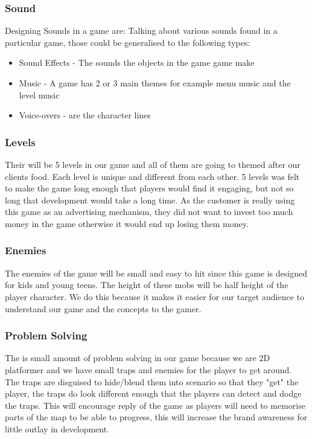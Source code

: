 \documentclass{article}
\begin{document}
\subsubsection{Sound}
Designing Sounds in a game are:
Talking about various sounds found in a particular game, those could be generalised to the following types: 
\begin{itemize}
	\item Sound Effects - The sounds the objects in the game game make
	\item Music -  A game has 2 or 3 main themes for example menu music and the level music
	\item Voice-overs - are the character lines
\end{itemize}

\subsubsection{Levels}
Their will be 5 levels in our game and all of them are going to themed after our clients food. Each level is unique and different from each other. 5 levels was felt to make the game long enough that players would find it engaging, but not so long that development would take a long time. As the customer is really using this game as an advertising mechanism, they did not want to invest too much money in the game otherwise it would end up losing them money.

\subsubsection{Enemies}
The enemies of the game will be small and easy to hit since this game is designed for kids and young teens. The height of these mobs will be half height of the player character. We do this because it makes it easier for our target audience to understand our game and the concepts to the gamer. 


\subsubsection{Problem Solving}
The is small amount of problem solving in our game because we are 2D platformer and we have small traps and enemies for the player to get around. The traps are disguised to hide/blend them into scenario so that they "get" the player, the traps do look different enough that the players can detect and dodge the traps. This will encourage reply of the game as players will need to memorise parts of the map to be able to progress, this will increase the brand awareness for little outlay in development.
\end{document}

